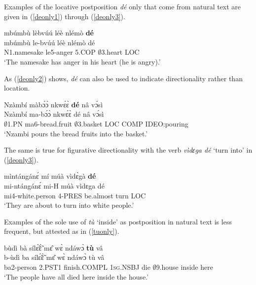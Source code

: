 Examples of the locative postposition {\itshape dé} only that come from natural text are given in (\ref{deonly1}) through (\ref{deonly3}).

\begin{exe} 
\ex\label{deonly1} 
  \glll mbúmbù lèbvúú léè nlémò {\bfseries dé} \\
         mbúmbù le-bvúú léè nlémò dé \\
        N1.namesake le5-anger 5.COP $\emptyset$3.heart LOC  \\
    \trans `The namesake has anger in his heart (he is angry).'
\end{exe}

\noindent As (\ref{deonly2}) shows, {\itshape dé} can also be used to indicate directionality rather than location.

\begin{exe} 
\ex\label{deonly2}
  \glll Nzàmbí màbɔ́ɔ̀ nkwɛ́ɛ̀ {\bfseries dé} nâ vɔ́sì \\
        Nzàmbí ma-bɔ́ɔ̀ nkwɛ́ɛ̀ dé nâ vɔ́sì \\
          $\emptyset$1.PN ma6-bread.fruit $\emptyset$3.basket LOC COMP IDEO:pouring\\
    \trans `Nzambi pours the bread fruits into the basket.'
\end{exe}

\noindent The same is true for figurative directionality with the verb {\itshape vìdɛga dé} `turn into' in (\ref{deonly3}).

\begin{exe} 
\ex\label{deonly3}
  \glll mìntángánɛ́ mí múà vìdɛ̀gà {\bfseries dé} \\
       mi-ntángánɛ́ mi-H múà vìdɛga dé \\
       mi4-white.person 4-PRES be.almost turn LOC  \\
    \trans `They are about to turn into white people.'
\end{exe}


Examples of the sole use of {\itshape tù} `inside' as postposition in natural text is less frequent, but attested as in (\ref{tuonly}). 

\begin{exe} 
\ex\label{tuonly}
  \glll bùdì bà sílɛ̃́ɛ̃̀ mɛ̂ wɛ̀ ndáwɔ̀ {\bfseries tù} vâ \\
        b-ùdì ba sílɛ̃́ɛ̃̀ mɛ̂ wɛ̀ ndáwɔ̀ tù vâ \\
       ba2-person 2.PST1 finish.COMPL 1\textsc{sg}.NSBJ die $\emptyset$9.house inside here  \\
    \trans `The people have all died here inside the house.'
\end{exe} 




